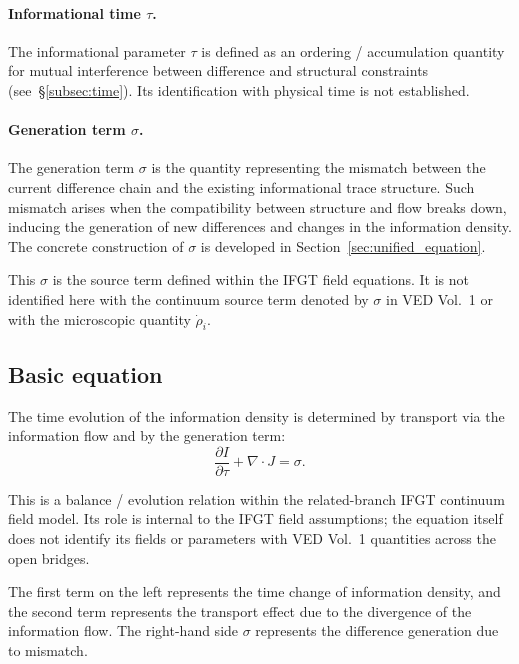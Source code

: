 \paragraph{Informational time $\tau$.}
The informational parameter $\tau$ is defined as an ordering / accumulation
quantity for mutual interference between difference and structural constraints
(see~§\ref{subsec:time}). Its identification with physical time is not
established.

\paragraph{Generation term $\sigma$.}
The generation term $\sigma$ is the quantity representing the mismatch between the current difference chain and the existing informational trace structure. Such mismatch arises when the compatibility between structure and flow breaks down, inducing the generation of new differences and changes in the information density. The concrete construction of $\sigma$ is developed in Section~\ref{sec:unified_equation}.

This $\sigma$ is the source term defined within the IFGT field equations. It is not identified here with the continuum source term denoted by $\sigma$ in VED Vol.~1 or with the microscopic quantity $\dot\rho_i$.

\subsection{Basic equation}
\label{subsec:basic_equation}

The time evolution of the information density is determined by transport via the information flow and by the generation term:
\begin{equation}
\frac{\partial I}{\partial \tau} + \nabla \cdot J = \sigma.
\label{eq:basic}
\end{equation}

This is a balance / evolution relation within the related-branch IFGT
continuum field model. Its role is internal to the IFGT field assumptions;
the equation itself does not identify its fields or parameters with VED
Vol.~1 quantities across the open bridges.

The first term on the left represents the time change of information density, and the second term represents the transport effect due to the divergence of the information flow. The right-hand side $\sigma$ represents the difference generation due to mismatch.

